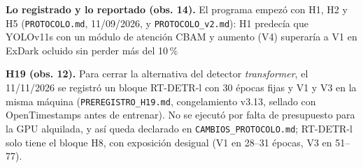 \noindent\textbf{Lo registrado y lo reportado (obs. 14).} El programa empezó con H1, H2 y H5 (\texttt{PROTOCOLO.md}, 11/09/2026, y \texttt{PROTOCOLO\_v2.md}): H1 predecía que YOLOv11s con un módulo de atención CBAM y aumento (V4) superaría a V1 en ExDark ocluido sin perder más del 10\,\%%

\noindent\textbf{H19 (obs. 12).} Para cerrar la alternativa del detector \emph{transformer}, el 11/11/2026 se registró un bloque RT-DETR-l con 30 épocas fijas y V1 y V3 en la misma máquina (\texttt{PREREGISTRO\_H19.md}, congelamiento v3.13, sellado con OpenTimestamps antes de entrenar). No se ejecutó por falta de presupuesto para la GPU alquilada, y así queda declarado en \texttt{CAMBIOS\_PROTOCOLO.md}; RT-DETR-l solo tiene el bloque H8, con exposición desigual (V1 en 28--31 épocas, V3 en 51--77).

